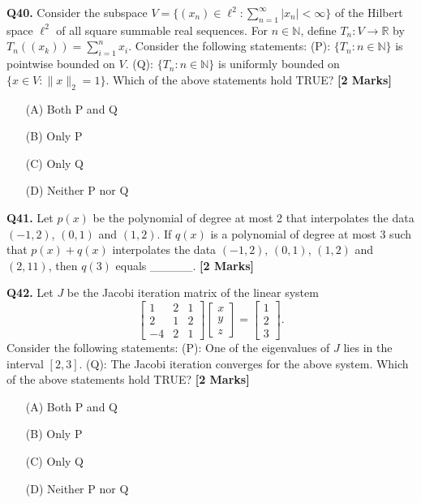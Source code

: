 \documentclass[11pt]{article}
\newcommand{\questionb}[2]{
    \noindent\textbf{Q#2.} #1 \hfill \textbf{[2 Marks]}
}
\begin{document}
\questionb{Consider the subspace \( V = \{(x_n) \in \ell^2 : \sum_{n=1}^{\infty} |x_n| < \infty\} \) of the Hilbert space \( \ell^2 \) of all square summable real sequences. For \( n \in \mathbb{N} \), define \( T_n: V \to \mathbb{R} \) by \( T_n((x_k)) = \sum_{i=1}^{n} x_i \). Consider the following statements:
(P): \(\{T_n : n \in \mathbb{N}\}\) is pointwise bounded on \( V \).
(Q): \(\{T_n : n \in \mathbb{N}\}\) is uniformly bounded on \(\{x \in V : \|x\|_2 = 1\}\).
Which of the above statements hold TRUE?}{40}
\begin{enumerate}
    \item[(A)] Both P and Q  
    \item[(B)] Only P  
    \item[(C)] Only Q  
    \item[(D)] Neither P nor Q  
\end{enumerate}
\vspace{0.5cm}

\questionb{Let \( p(x) \) be the polynomial of degree at most 2 that interpolates the data \((-1, 2)\), \((0, 1)\) and \((1, 2)\). If \( q(x) \) is a polynomial of degree at most 3 such that \( p(x) + q(x) \) interpolates the data \((-1, 2)\), \((0, 1)\), \((1, 2)\) and \((2, 11)\), then \( q(3) \) equals \_\_\_\_\_.}{41}
\vspace{0.5cm}

\questionb{Let \( J \) be the Jacobi iteration matrix of the linear system
\[\begin{bmatrix}
1 & 2 & 1 \\
2 & 1 & 2 \\
-4 & 2 & 1 
\end{bmatrix}
\begin{bmatrix}
x \\
y \\
z 
\end{bmatrix}
=
\begin{bmatrix}
1 \\
2 \\
3 
\end{bmatrix}.\]
Consider the following statements:
(P): One of the eigenvalues of \( J \) lies in the interval \([2, 3]\).  
(Q): The Jacobi iteration converges for the above system.
Which of the above statements hold TRUE?}{42}
\begin{enumerate}
    \item[(A)] Both P and Q  
    \item[(B)] Only P  
    \item[(C)] Only Q  
    \item[(D)] Neither P nor Q  
\end{enumerate}
\vspace{0.5cm}
\end{document}
